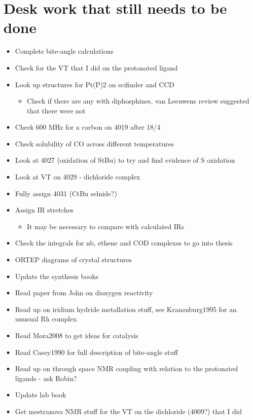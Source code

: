\section{Desk work that still needs to be done}
\begin{itemize}
\item{Complete bite-angle calculations}
\item{Check for the VT that I did on the protonated ligand}
\item{Look up structures for Pt(P)2 on scifinder and CCD}
	\begin{itemize}
	\item{Check if there are any with diphosphines, van Leeuwens review suggested that there were not}
	\end{itemize}
\item{Check 600 MHz for a carbon on 4019 after 18/4}
\item{Check solubility of CO across different temperatures}
\item{Look at 4027 (oxidation of StBu) to try and find evidence of S oxidation}
\item{Look at VT on 4029 - dichloride complex}
\item{Fully assign 4031 (CtBu selnide?)}
\item{Assign IR stretches}
	\begin{itemize}
	\item{It may be necessary to compare with calculated IRs}
	\end{itemize}
\item{Check the integrals for nb, ethene and COD complexes to go into thesis}
\item{ORTEP diagrams of crystal structures}
\item{Update the synthesis books}
\item{Read paper from John on dioxygen reactivity}
\item{Read up on iridium hydride metallation stuff, see Kranenburg1995 for an unusual Rh complex}
\item{Read Mora2008 to get ideas for catalysis}
\item{Read Casey1990 for full description of bite-angle stuff}
\item{Read up on through space NMR coupling with relation to the protonated ligands - ask Robin?}
\item{Update lab book}
\item{Get mestranova NMR stuff for the VT on the dichloride (4009?) that I did}
\end{itemize}

